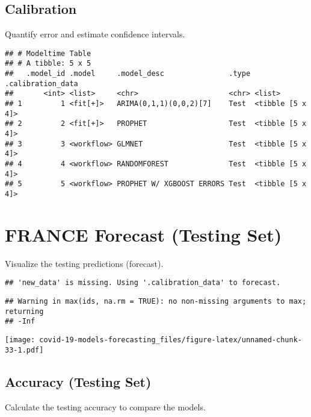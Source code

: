 \documentclass[
]{article}
\begin{document}
\hypertarget{calibration-1}{%
\subsection{Calibration}\label{calibration-1}}

Quantify error and estimate confidence intervals.

\begin{verbatim}
## # Modeltime Table
## # A tibble: 5 x 5
##   .model_id .model     .model_desc               .type .calibration_data
##       <int> <list>     <chr>                     <chr> <list>           
## 1         1 <fit[+]>   ARIMA(0,1,1)(0,0,2)[7]    Test  <tibble [5 x 4]> 
## 2         2 <fit[+]>   PROPHET                   Test  <tibble [5 x 4]> 
## 3         3 <workflow> GLMNET                    Test  <tibble [5 x 4]> 
## 4         4 <workflow> RANDOMFOREST              Test  <tibble [5 x 4]> 
## 5         5 <workflow> PROPHET W/ XGBOOST ERRORS Test  <tibble [5 x 4]>
\end{verbatim}

\hypertarget{france-forecast-testing-set}{%
\section{FRANCE Forecast (Testing
Set)}\label{france-forecast-testing-set}}

Visualize the testing predictions (forecast).

\begin{verbatim}
## 'new_data' is missing. Using '.calibration_data' to forecast.
\end{verbatim}

\begin{verbatim}
## Warning in max(ids, na.rm = TRUE): no non-missing arguments to max; returning
## -Inf
\end{verbatim}

\texttt{[image: covid-19-models-forecasting\_files/figure-latex/unnamed-chunk-33-1.pdf]}

\hypertarget{accuracy-testing-set-1}{%
\subsection{Accuracy (Testing Set)}\label{accuracy-testing-set-1}}

Calculate the testing accuracy to compare the models.
\end{document}
